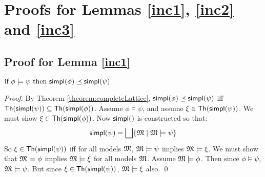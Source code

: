 \section{Proofs for Lemmas \ref{inc1}, \ref{inc2} and \ref{inc3}}\label{app:completeness:proofs}

\subsection{Proof for Lemma \ref{inc1}}
$\mbox{if }\phi \models \psi \mbox{ then } \mathsf{simpl}(\phi) \preceq \mathsf{simpl}(\psi)$

\begin{proof}
By Theorem \ref{theorem:completeLattice}, $ \mathsf{simpl}(\phi) \preceq \mathsf{simpl}(\psi)$ iff $\mathsf{Th}(\mathsf{simpl}(\psi)) \subseteq  \mathsf{Th}(\mathsf{simpl}(\phi))$.
Assume $\phi \models \psi$, and assume $\xi \in \mathsf{Th}(\mathsf{simpl}(\psi)) $. We must show $\xi \in \mathsf{Th}(\mathsf{simpl}(\phi)) $.
Now $\SIMPL$ is constructed so that:
\[
\mathsf{simpl}(\psi) = \bigsqcup \{ \frak{M} \; | \; \frak{M} \models \psi \}
\]
So  $\xi \in \mathsf{Th}(\mathsf{simpl}(\psi)) $ iff for all models $\frak{M}$, $\frak{M} \models \psi$ implies $\frak{M} \models \xi$.
We must show that $\frak{M} \models \phi$ implies $\frak{M} \models \xi$ for all models $\frak{M}$.
Assume $\frak{M} \models \phi$. Then since $\phi \models \psi$,  $\frak{M} \models \psi$. 
But since $\xi \in \mathsf{Th}(\mathsf{simpl}(\psi)) $, $\frak{M} \models \xi$ also.
\qed
\end{proof}

